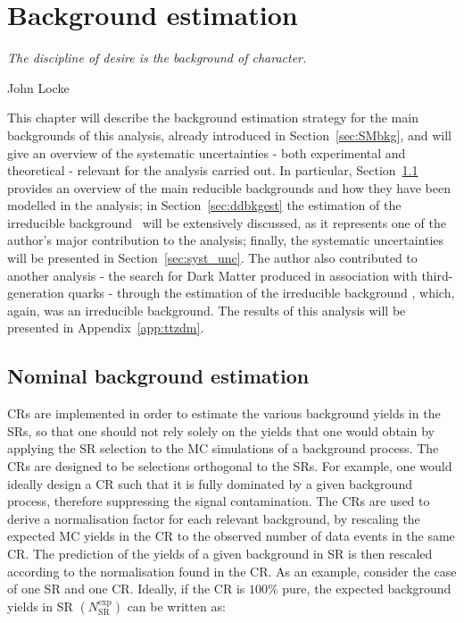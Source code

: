 \chapter{Background estimation}
\label{ch:bkgest}
\epigraph{\emph{The discipline of desire is the background of character.}}{John Locke}

	This chapter will describe the background estimation strategy for the main backgrounds of this analysis, already introduced in Section~\ref{sec:SMbkg}, and will give an overview of the systematic uncertainties - both experimental and theoretical - relevant for the analysis carried out. In particular, Section~\ref{sec:bkgest} provides an overview of the main reducible backgrounds and how they have been modelled in the analysis; in Section~\ref{sec:ddbkgest} the estimation of the irreducible background \ttZ\ will be extensively discussed, as it represents one of the author's major contribution to the analysis; finally, the systematic uncertainties will be presented in Section~\ref{sec:syst_unc}. The author also contributed to another analysis - the search for Dark Matter produced in association with third-generation quarks - through the estimation of the irreducible background \ttZ, which, again, was an irreducible background. The results of this analysis will be presented in Appendix~\ref{app:ttzdm}. 

	\section{Nominal background estimation}
	\label{sec:bkgest}

		\acp{CR} are implemented in order to estimate the various background yields in the \acp{SR}, so that one should not rely solely on the yields that one would obtain by applying the \ac{SR} selection to the \ac{MC} simulations of a background process. The \acp{CR} are designed to be selections orthogonal to the \acp{SR}. For example, one would ideally design a \ac{CR} such that it is fully dominated by a given background process, therefore suppressing the signal contamination. The \acp{CR} are used to derive a normalisation factor for each relevant background, by rescaling the expected \ac{MC} yields in the \ac{CR} to the observed number of data events in the same \ac{CR}. The prediction of the yields of a given background in \ac{SR} is then rescaled according to the normalisation found in the \ac{CR}. As an example, consider the case of one \ac{SR} and one \ac{CR}. Ideally, if the \ac{CR} is $100\%$ pure, the expected background yields in \ac{SR} $\left(N_{\mathrm{SR}}^{\mathrm{exp}}\right)$ can be written as:


